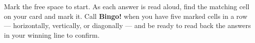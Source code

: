 %
%
Mark the free space to start. As each answer is read aloud, find the matching
cell on your card and mark it. Call \textbf{Bingo!} when you have five marked
cells in a row --- horizontally, vertically, or diagonally --- and be ready to
read back the answers in your winning line to confirm.
